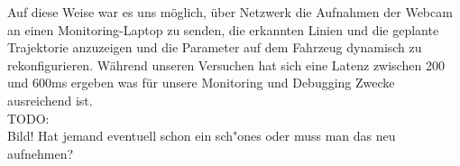 Auf diese Weise war es uns m\"oglich, \"uber Netzwerk die Aufnahmen der Webcam an einen Monitoring-Laptop zu senden, die erkannten Linien und die geplante Trajektorie anzuzeigen und die Parameter auf dem Fahrzeug dynamisch zu rekonfigurieren. W\"ahrend unseren Versuchen hat sich eine Latenz zwischen 200 und 600ms ergeben was f\"ur unsere Monitoring und Debugging Zwecke ausreichend ist. \\

TODO:\\
Bild! Hat jemand eventuell schon ein sch"ones oder muss man das neu aufnehmen?